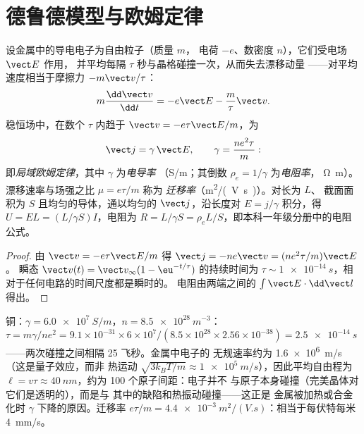 \section{德鲁德模型与欧姆定律}

\begin{proposition}\label{prop:b2:charges-currents-conduction:drude}
设金属中的导电电子为自由粒子（质量 $m$，
电荷 $-e$、数密度 $n$），它们受电场 $\vect E$ 作用，
并平均每隔 $\tau$ 秒与晶格碰撞一次，从而失去漂移动量
——对平均速度相当于摩擦力 $-m\vect v/\tau$：
\[
m\frac{\dd\vect v}{\dd t} = -e\vect E - \frac m\tau\vect v .
\]
稳恒场中，在数个 $\tau$ 内趋于 $\vect v = -e\tau
\vect E/m$，为
\[
\vect j = \gamma\,\vect E , \qquad \gamma = \frac{ne^2\tau}{m} :
\]
即\emph{局域欧姆定律}，其中 $\gamma$ 为\emph{电导率}
（\unit{S/m}；其倒数 $\rho_e = 1/\gamma$ 为\emph{电阻率}，
\unit{\ohm.m}）。漂移速率与场强之比 $\mu = e\tau/m$ 称为
\emph{迁移率}（\unit{m^2/(V.s)}）。对长为 $L$、
截面面积为 $S$ 且均匀的导体，通以均匀的 $\vect j$，沿长度对 $E = j/\gamma$
积分，得 $U = EL = (L/\gamma S)I$，电阻为 $R = L/\gamma S
= \rho_eL/S$，即本科一年级分册中的电阻公式。
\end{proposition}

\begin{proof}
由 $\vect v = -e\tau\vect E/m$ 得 $\vect j = -ne\vect v = (ne^2\tau/m)\vect E$。
瞬态 $\vect v(t) = \vect v_\infty(1 - \eu^{-t/\tau})$ 的持续时间为 $\tau \sim
\qty{1e-14}{s}$，相对于任何电路的时间尺度都是瞬时的。
电阻由两端之间的 $\int\vect E\cdot\dd\vect l$ 得出。
\end{proof}

\begin{example}[铜，由实测电导率求得]\label{ex:b2:charges-currents-conduction:copper}
铜：$\gamma = \qty{6.0e7}{S/m}$，$n = \qty{8.5e28}{m^{-3}}$：$\tau = m\gamma/ne^2 =
9.1 \times 10^{-31} \times 6 \times 10^7/(8.5 \times 10^{28} \times 2.56 \times 10^{-38}) = \qty{2.5e-14}{s}$
——两次碰撞之间相隔 25 飞秒。金属中电子的
无规速率约为 \qty{1.6e6}{m/s}（这是量子效应，而非
热运动 $\sqrt{3k_BT/m} \approx \qty{1e5}{m/s}$），因此平均自由程为 $\ell
= v\tau \approx \qty{40}{nm}$，约为 100 个原子间距：电子并不
与原子本身碰撞（完美晶体对它们是透明的），而是与
其中的缺陷和热振动碰撞——这正是
金属被加热或合金化时 $\gamma$ 下降的原因。迁移率 $e\tau/m =
\qty{4.4e-3}{m^2/(V.s)}$：相当于每伏特每米 \qty{4}{mm/s}。
\end{example}

